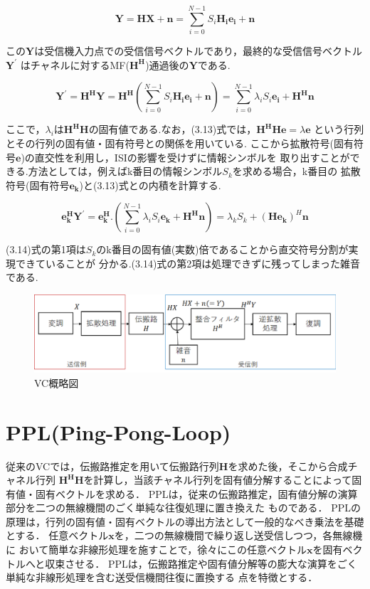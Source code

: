 \begin{equation}
    \bm{Y} = \bm{HX}+\bm{n} = \sum_{i=0}^{N-1} S_i\bm{H_ie_i}+\bm{n}
\end{equation}

この$\bm{Y}$は受信機入力点での受信信号ベクトルであり，最終的な受信信号ベクトル$\bm{Y^{\prime}}$
はチャネルに対するMF($\bm{H^H}$)通過後の$\bm{Y}$である.

\begin{equation}
    \bm{Y^{\prime}}=\bm{H^HY}=\bm{H^H}
    \left(
        \sum_{i=0}^{N-1} S_i\bm{H_ie_i}+\bm{n}
    \right)
    =\sum_{i=0}^{N-1} \lambda_iS_i\bm{e_i}+\bm{H^Hn}
\end{equation}

ここで，$\lambda_i$は$\bm{H^HH}$の固有値である.なお，(3.13)式では，$\bm{H^HHe}=\lambda\bm{e}$
という行列とその行列の固有値・固有符号との関係を用いている.
ここから拡散符号(固有符号$\bm{e}$)の直交性を利用し，ISIの影響を受けずに情報シンボルを
取り出すことができる.方法としては，例えばk番目の情報シンボル$S_k$を求める場合，k番目の
拡散符号(固有符号$\bm{e_k}$)と(3.13)式との内積を計算する.

\begin{equation}
    \bm{e_k^HY^{\prime}}=\bm{e_k^H}.
    \left(
        \sum_{i=0}^{N-1} \lambda_iS_i\bm{e_k}+\bm{H^Hn}
    \right)
    =\lambda_kS_k+(\bm{He_k})^H\bm{n}
\end{equation}

(3.14)式の第1項は$S_k$のk番目の固有値(実数)倍であることから直交符号分割が実現できていることが
分かる.(3.14)式の第2項は処理できずに残ってしまった雑音である.

\begin{figure}
    \centering
    \includegraphics[width=\linewidth]{chapter3/figure/VC.eps}
    \caption{VC概略図}
    \label{figVC}
\end{figure}

\section{PPL(Ping-Pong-Loop)}
従来のVCでは，伝搬路推定を用いて伝搬路行列$\bm{H}$を求めた後，そこから合成チャネル行列
$\bm{H^HH}$を計算し，当該チャネル行列を固有値分解することによって固有値・固有ベクトルを求める．
PPLは，従来の伝搬路推定，固有値分解の演算部分を二つの無線機間のごく単純な往復処理に置き換えた
ものである．
PPLの原理は，行列の固有値・固有ベクトルの導出方法として一般的なべき乗法を基礎とする．
任意ベクトル$\bm{x}$を，二つの無線機間で繰り返し送受信しつつ，各無線機に
おいて簡単な非線形処理を施すことで，徐々にこの任意ベクトル$\bm{x}$を固有ベクトルへと収束させる．
PPLは，伝搬路推定や固有値分解等の膨大な演算をごく単純な非線形処理を含む送受信機間往復に置換する
点を特徴とする．

